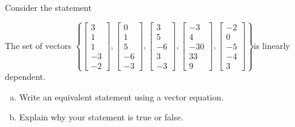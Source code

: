 
\begin{exerciseStatement}


Consider the statement 
\begin{center}\begin{minipage}{0.8\textwidth}
 The set of vectors \( \left\{ \left[\begin{array}{c}
3 \\
1 \\
1 \\
-3 \\
-2
\end{array}\right] , \left[\begin{array}{c}
0 \\
1 \\
5 \\
-6 \\
-3
\end{array}\right] , \left[\begin{array}{c}
3 \\
5 \\
-6 \\
3 \\
-3
\end{array}\right] , \left[\begin{array}{c}
-3 \\
4 \\
-30 \\
33 \\
9
\end{array}\right] , \left[\begin{array}{c}
-2 \\
0 \\
-5 \\
-4 \\
3
\end{array}\right] \right\} \)is linearly dependent.
\end{minipage}\end{center}
    


\begin{enumerate}[(a)]
\item  Write an equivalent statement using a vector equation.
\item  Explain why your statement is true or false.
\end{enumerate}
    
\end{exerciseStatement}
    
